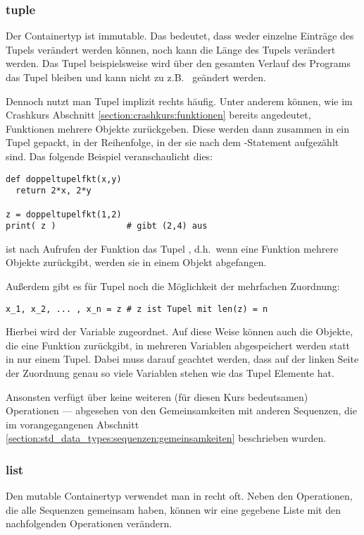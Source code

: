 \subsubsection{tuple}
\label{section:std_data_types:sequenzen:tuple}
Der Containertyp  ist immutable. Das bedeutet, dass weder einzelne Einträge des Tupels verändert werden können, 
noch kann die Länge des Tupels verändert werden. Das Tupel  beispielsweise wird über den gesamten Verlauf des 
Programs das Tupel  bleiben und kann nicht zu z.B.\  geändert werden. 

Dennoch nutzt man Tupel implizit rechts häufig. Unter anderem können, wie im Crashkurs Abschnitt \ref{section:crashkurs:funktionen} bereits angedeutet, Funktionen 
mehrere Objekte zurückgeben. Diese werden dann zusammen in ein Tupel gepackt, in der Reihenfolge, in der sie nach dem 
-Statement aufgezählt sind. Das folgende Beispiel veranschaulicht dies:

\begin{lstlisting}
def doppeltupelfkt(x,y)
  return 2*x, 2*y

z = doppeltupelfkt(1,2)
print( z )              # gibt (2,4) aus
\end{lstlisting}

 ist nach Aufrufen der Funktion das Tupel , d.h.\ wenn eine Funktion mehrere Objekte zurückgibt, werden sie in 
einem Objekt abgefangen.

Außerdem gibt es für Tupel noch die Möglichkeit der mehrfachen Zuordnung:

\begin{lstlisting}
x_1, x_2, ... , x_n = z # z ist Tupel mit len(z) = n
\end{lstlisting}

Hierbei wird  der Variable  zugeordnet. Auf diese Weise können auch die Objekte, die eine Funktion 
zurückgibt, in mehreren Variablen abgespeichert werden statt in nur einem Tupel. Dabei muss darauf geachtet werden, dass 
auf der linken Seite der Zuordnung genau so viele Variablen stehen wie das Tupel Elemente hat.

Ansonsten verfügt  über keine weiteren (für diesen Kurs bedeutsamen) Operationen --- abgesehen von den Gemeinsamkeiten mit 
anderen Sequenzen, die im vorangegangenen Abschnitt \ref{section:std_data_types:sequenzen:gemeinsamkeiten} beschrieben wurden.


\subsubsection{list}
\label{section:std_data_types:sequenzen:listen}
Den mutable Containertyp  verwendet man in \Python recht oft.
Neben den Operationen, die alle Sequenzen gemeinsam haben, können wir eine gegebene Liste  mit den nachfolgenden Operationen verändern.

